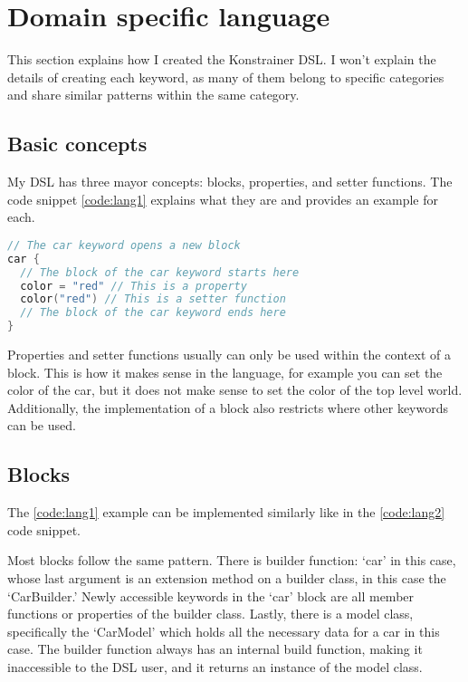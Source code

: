 \section{Domain specific language}
\label{sec:dsl}

This section explains how I created the Konstrainer DSL. I won't explain the details of creating each keyword, as many of them belong to specific categories and share similar patterns within the same category.

\subsection{Basic concepts}

My DSL has three mayor concepts: blocks, properties, and setter functions. The code snippet \ref{code:lang1} explains what they are and provides an example for each.

\begin{lstlisting}[caption={Language concepts},language=Kotlin,label=code:lang1]
// The car keyword opens a new block
car { 
  // The block of the car keyword starts here
  color = "red" // This is a property
  color("red") // This is a setter function
  // The block of the car keyword ends here
}
\end{lstlisting}

Properties and setter functions usually can only be used within the context of a block. This is how it makes sense in the language, for example you can set the color of the car, but it does not make sense to set the color of the top level world. Additionally, the implementation of a block also restricts where other keywords can be used.

\subsection{Blocks}
 
The \ref{code:lang1} example can be implemented similarly like in the \ref{code:lang2} code snippet.

Most blocks follow the same pattern. There is builder function: `car' in this case, whose last argument is an extension method on a builder class, in this case the `CarBuilder.' Newly accessible keywords in the `car' block are all member functions or properties of the builder class. Lastly, there is a model class, specifically the `CarModel' which holds all the necessary data for a car in this case. The builder function always has an internal build function, making it inaccessible to the DSL user, and it returns an instance of the model class.

